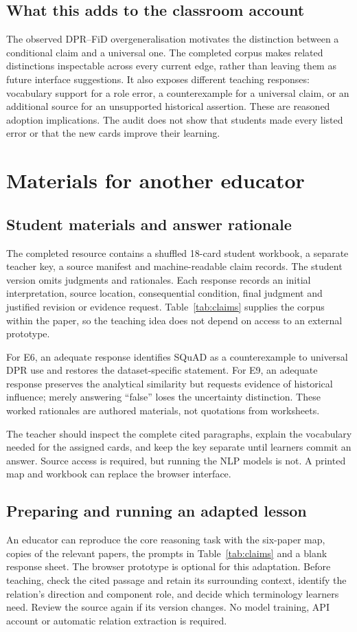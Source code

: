 \subsection{What this adds to the classroom account}
The observed DPR--FiD overgeneralisation motivates the distinction between a conditional claim and a universal one. The completed corpus makes related distinctions inspectable across every current edge, rather than leaving them as future interface suggestions. It also exposes different teaching responses: vocabulary support for a role error, a counterexample for a universal claim, or an additional source for an unsupported historical assertion. These are reasoned adoption implications. The audit does not show that students made every listed error or that the new cards improve their learning.

\section{Materials for another educator}
\subsection{Student materials and answer rationale}
The completed resource contains a shuffled 18-card student workbook, a separate teacher key, a source manifest and machine-readable claim records. The student version omits judgments and rationales. Each response records an initial interpretation, source location, consequential condition, final judgment and justified revision or evidence request. Table~\ref{tab:claims} supplies the corpus within the paper, so the teaching idea does not depend on access to an external prototype.

For E6, an adequate response identifies SQuAD as a counterexample to universal DPR use and restores the dataset-specific statement. For E9, an adequate response preserves the analytical similarity but requests evidence of historical influence; merely answering ``false'' loses the uncertainty distinction. These worked rationales are authored materials, not quotations from worksheets.

The teacher should inspect the complete cited paragraphs, explain the vocabulary needed for the assigned cards, and keep the key separate until learners commit an answer. Source access is required, but running the NLP models is not. A printed map and workbook can replace the browser interface.

\subsection{Preparing and running an adapted lesson}
An educator can reproduce the core reasoning task with the six-paper map, copies of the relevant papers, the prompts in Table~\ref{tab:claims} and a blank response sheet. The browser prototype is optional for this adaptation. Before teaching, check the cited passage and retain its surrounding context, identify the relation's direction and component role, and decide which terminology learners need. Review the source again if its version changes. No model training, API account or automatic relation extraction is required.

